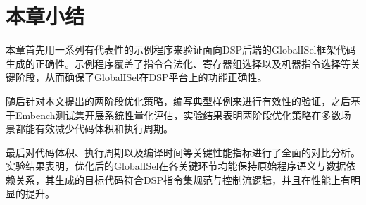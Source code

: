 \section{本章小结}
本章首先用一系列有代表性的示例程序来验证面向DSP后端的GlobalISel框架代码生成的正确性。示例程序覆盖了指令合法化、寄存器组选择以及机器指令选择等关键阶段，从而确保了GlobalISel在DSP平台上的功能正确性。

\par

随后针对本文提出的两阶段优化策略，编写典型样例来进行有效性的验证，之后基于Embench测试集开展系统性量化评估，实验结果表明两阶段优化策略在多数场景都能有效减少代码体积和执行周期。

\par

最后对代码体积、执行周期以及编译时间等关键性能指标进行了全面的对比分析。实验结果表明，优化后的GlobalISel在各关键环节均能保持原始程序语义与数据依赖关系，其生成的目标代码符合DSP指令集规范与控制流逻辑，并且在性能上有明显的提升。
